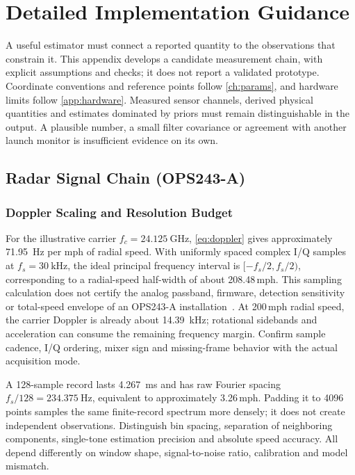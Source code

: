 \chapter{Detailed Implementation Guidance}
\label{app:impl}

A useful estimator must connect a reported quantity to the observations that constrain it.
This appendix develops a candidate measurement chain, with explicit assumptions and checks; it does not report a validated prototype.
Coordinate conventions and reference points follow \cref{ch:params}, and hardware limits follow \cref{app:hardware}.
Measured sensor channels, derived physical quantities and estimates dominated by priors must remain distinguishable in the output.
A plausible number, a small filter covariance or agreement with another launch monitor is insufficient evidence on its own.

\section{Radar Signal Chain (OPS243-A)}
\label{app:radardsp}

\subsection{Doppler Scaling and Resolution Budget}

For the illustrative carrier $f_c=\SI{24.125}{\giga\hertz}$, \cref{eq:doppler} gives approximately \SI{71.95}{\hertz} per mph of radial speed.
With uniformly spaced complex I/Q samples at $f_s=\SI{30}{\kilo\hertz}$, the ideal principal frequency interval is $[-f_s/2,f_s/2)$, corresponding to a radial-speed half-width of about 208.48\,mph.
This sampling calculation does not certify the analog passband, firmware, detection sensitivity or total-speed envelope of an OPS243-A installation~\cite{ops243brief,an029}.
At 200\,mph radial speed, the carrier Doppler is already about \SI{14.39}{\kilo\hertz}; rotational sidebands and acceleration can consume the remaining frequency margin.
Confirm sample cadence, I/Q ordering, mixer sign and missing-frame behavior with the actual acquisition mode.

A 128-sample record lasts \SI{4.267}{\milli\second} and has raw Fourier spacing $f_s/128=\SI{234.375}{\hertz}$, equivalent to approximately 3.26\,mph.
Padding it to 4096 points samples the same finite-record spectrum more densely; it does not create independent observations.
Distinguish bin spacing, separation of neighboring components, single-tone estimation precision and absolute speed accuracy.
All depend differently on window shape, signal-to-noise ratio, calibration and model mismatch.

